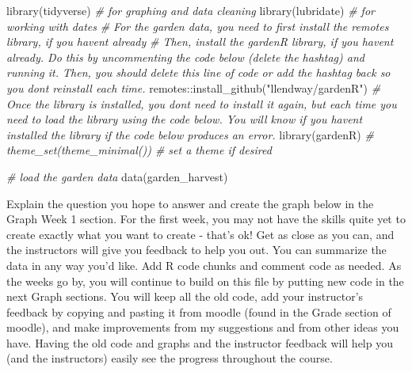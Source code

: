 \documentclass[
]{article}
\author{Marcela Saavedra Gonzalez}
\date{}
\newenvironment{Shaded}{\begin{snugshade}}{\end{snugshade}}
\newcommand{\CommentTok}[1]{\textcolor[rgb]{0.56,0.35,0.01}{\textit{#1}}}
\newcommand{\FunctionTok}[1]{\textcolor[rgb]{0.00,0.00,0.00}{#1}}
\newcommand{\NormalTok}[1]{#1}
\newcommand{\SpecialCharTok}[1]{\textcolor[rgb]{0.00,0.00,0.00}{#1}}
\newcommand{\StringTok}[1]{\textcolor[rgb]{0.31,0.60,0.02}{#1}}
\begin{document}
{
\setcounter{tocdepth}{2}
\tableofcontents
}
\begin{Shaded}
\begin{Highlighting}[]
\FunctionTok{library}\NormalTok{(tidyverse)         }\CommentTok{\# for graphing and data cleaning}
\FunctionTok{library}\NormalTok{(lubridate)         }\CommentTok{\# for working with dates}
\CommentTok{\# For the garden data, you need to first install the remotes library, if you haven\textquotesingle{}t already}
\CommentTok{\# Then, install the gardenR library, if you haven\textquotesingle{}t already. Do this by uncommenting the code below (delete the hashtag) and running it. Then, you should delete this line of code or add the hashtag back so you don\textquotesingle{}t reinstall each time.}
\NormalTok{remotes}\SpecialCharTok{::}\FunctionTok{install\_github}\NormalTok{(}\StringTok{"llendway/gardenR"}\NormalTok{)}
\CommentTok{\# Once the library is installed, you don\textquotesingle{}t need to install it again, but each time you need to load the library using the code below. You will know if you haven\textquotesingle{}t installed the library if the code below produces an error.}
\FunctionTok{library}\NormalTok{(gardenR)}
\CommentTok{\# theme\_set(theme\_minimal())  \# set a theme if desired}
\end{Highlighting}
\end{Shaded}

\begin{Shaded}
\begin{Highlighting}[]
\CommentTok{\# load the garden data }
\FunctionTok{data}\NormalTok{(garden\_harvest)}
\end{Highlighting}
\end{Shaded}

Explain the question you hope to answer and create the graph below in
the Graph Week 1 section. For the first week, you may not have the
skills quite yet to create exactly what you want to create - that's ok!
Get as close as you can, and the instructors will give you feedback to
help you out. You can summarize the data in any way you'd like. Add R
code chunks and comment code as needed. As the weeks go by, you will
continue to build on this file by putting new code in the next Graph
sections. You will keep all the old code, add your instructor's feedback
by copying and pasting it from moodle (found in the Grade section of
moodle), and make improvements from my suggestions and from other ideas
you have. Having the old code and graphs and the instructor feedback
will help you (and the instructors) easily see the progress throughout
the course.
\end{document}
